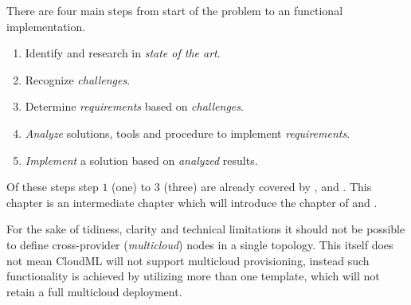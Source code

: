 There are four main steps from start of the problem to an functional implementation.
\begin{enumerate}
  \item Identify and research in \emph{state of the art}.
  \item Recognize \emph{challenges}.
  \item Determine \emph{requirements} based on \emph{challenges}.
  \item \emph{Analyze} solutions, tools and procedure to implement \emph{requirements}.
  \item \emph{Implement} a solution based on \emph{analyzed} results.
\end{enumerate}
Of these steps step $1$ (one) to $3$ (three) are already covered by 
,  and .
This chapter is an intermediate chapter which will introduce the chapter of 
and .


For the sake of tidiness, clarity and technical limitations it 
should not be possible to define cross-provider (\emph{multicloud}) nodes in a single topology.
This itself does not mean CloudML will not support multicloud provisioning,
instead such functionality is achieved by utilizing more than one template,
which will not retain a full multicloud deployment.
